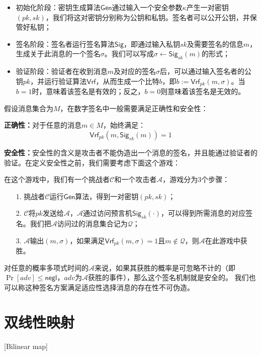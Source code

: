 \begin{itemize}
  \item 初始化阶段：密钥生成算法$\mathsf{Gen}$通过输入一个安全参数$\kappa$产生一对密钥$(pk,sk)$，我们将这对密钥分别称为公钥和私钥。签名者可以公开公钥，并保管好私钥；
  \item 签名阶段：签名者运行签名算法$\mathsf{Sig}$，即通过输入私钥$sk$及需要签名的信息$m$，生成关于此消息的一个签名$\sigma$。我们可以写成$\sigma\leftarrow \mathsf{Sig}_{sk}(m)$的形式；
  \item 验证阶段：验证者在收到消息$m$及对应的签名$\sigma$后，可以通过输入签名者的公钥$pk$，并运行验证算法$\mathsf{Vrf}$，从而生成一个比特$b$，即$b:= \mathsf{Vrf}_{pk}(m,\sigma)$。当$b=1$时，意味着该签名是有效的；反之，$b=0$则意味着该签名是无效的。
\end{itemize}

假设消息集合为$M$，在数字签名中一般需要满足正确性和安全性：

\textbf{正确性：}对于任意的消息$m\in M$，始终满足：
\begin{equation}
\mathsf{Vrf}_{pk}(m,\mathsf{Sig}_{sk}(m))=1
\end{equation}

\textbf{安全性：}安全性的含义是攻击者不能伪造出一个消息的签名，并且能通过验证者的验证。在定义安全性之前，我们需要考虑下面这个游戏：

在这个游戏中，我们有一个挑战者$\mathcal{C}$和一个攻击者$\mathcal{A}$，游戏分为3个步骤：
\begin{itemize}
  \item[1.] 挑战者$\mathcal{C}$运行$\mathsf{Gen}$算法，得到一对密钥$(pk,sk)$；
  \item[2.] $\mathcal{C}$将$pk$发送给$\mathcal{A}$，$\mathcal{A}$通过访问预言机$\mathsf{Sig}_{sk}(\cdot)$，可以得到所需消息的对应签名。我们把$\mathcal{A}$访问过的消息集合记为$\mathcal{Q}$；
  \item[3.] $\mathcal{A}$输出$(m,\sigma)$，如果满足$\mathsf{Vrf}_{pk}(m,\sigma)=1$且$m\notin \mathcal{Q}$，则$\mathcal{A}$在此游戏中获胜。
\end{itemize}

对任意的概率多项式时间的$\mathcal{A}$来说，如果其获胜的概率是可忽略不计的（即$\Pr[adv]\leq\mathsf{negl}$，$adv$为$\mathcal{A}$获胜的事件），那么这个签名机制就是安全的。
我们也可以称这种签名方案满足适应性选择消息的存在性不可伪造。

\section{双线性映射}[Bilinear map]

